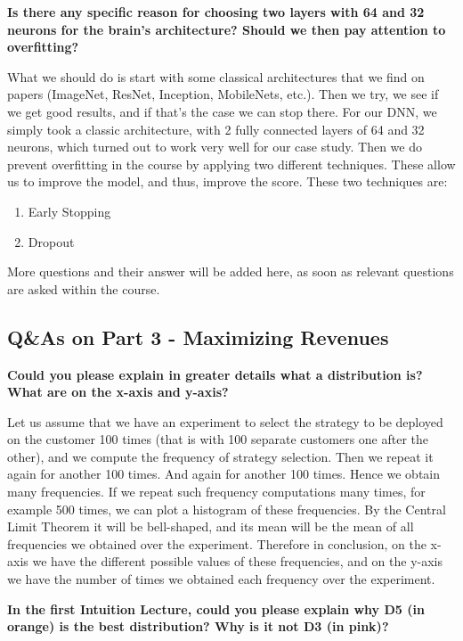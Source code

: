 \documentclass[]{book}
\begin{document}
\textbf{Is there any specific reason for choosing two layers with 64 and 32 neurons for the brain's architecture? Should we then pay attention to overfitting?}

What we should do is start with some classical architectures that we find on papers (ImageNet, ResNet, Inception, MobileNets, etc.). Then we try, we see if we get good results, and if that's the case we can stop there. For our DNN, we simply took a classic architecture, with 2 fully connected layers of 64 and 32 neurons, which turned out to work very well for our case study. Then we do prevent overfitting in the course by applying two different techniques. These allow us to improve the model, and thus, improve the score. These two techniques are:

\begin{enumerate}
    \item Early Stopping
    \item Dropout
\end{enumerate}

More questions and their answer will be added here, as soon as relevant questions are asked within the course.

\newpage

\subsection{Q\&As on Part 3 - Maximizing Revenues}

\textbf{Could you please explain in greater details what a distribution is? What are on the x-axis and y-axis?}

Let us assume that we have an experiment to select the strategy to be deployed on the customer 100 times (that is with 100 separate customers one after the other), and we compute the frequency of strategy selection. Then we repeat it again for another 100 times. And again for another 100 times. Hence we obtain many frequencies. If we repeat such frequency computations many times, for example 500 times, we can plot a histogram of these frequencies. By the Central Limit Theorem it will be bell-shaped, and its mean will be the mean of all frequencies we obtained over the experiment. Therefore in conclusion, on the x-axis we have the different possible values of these frequencies, and on the y-axis we have the number of times we obtained each frequency over the experiment.

\textbf{In the first Intuition Lecture, could you please explain why D5 (in orange) is the best distribution? Why is it not D3 (in pink)?}
\end{document}

